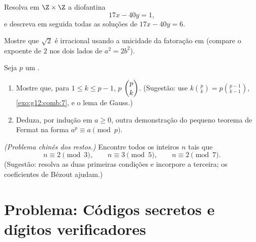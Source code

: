 \begin{exercise}[$\star\star$]\label{exo:g12:arith:7}
Resolva em $\Z \times \Z$ a  diofantina
\[
17x - 40y = 1,
\]
e descreva em seguida todas as soluções de $17x - 40y = 6$.
\end{exercise}

\begin{exercise}[$\star\star$]\label{exo:g12:arith:8}
Mostre que $\sqrt2$ é irracional usando a unicidade da fatoração em 
(compare o expoente de $2$ nos dois lados de $a^2 = 2b^2$).
\end{exercise}

\begin{exercise}[$\star\star\star$]\label{exo:g12:arith:9}
Seja $p$ um .
\begin{enumerate}
  \item Mostre que, para $1 \leq k \leq p - 1$, $p$ 
        $\dbinom{p}{k}$. (Sugestão: use $k\binom pk = p\binom{p-1}{k-1}$,
        \cref{exo:g12:comb:7}, e o lema de Gauss.)
  \item Deduza, por indução em $a \geq 0$, outra demonstração do pequeno
        teorema de Fermat na forma $a^p \equiv a \pmod p$.
\end{enumerate}
\end{exercise}

\begin{exercise}[$\star\star\star$]\label{exo:g12:arith:10}
\emph{(Problema chinês dos restos.)} Encontre todos os inteiros $n$ tais
que
\[
n \equiv 2 \pmod 3, \qquad n \equiv 3 \pmod 5, \qquad n \equiv 2 \pmod 7 .
\]
(Sugestão: resolva as duas primeiras condições e incorpore a terceira; os
coeficientes de Bézout ajudam.)
\end{exercise}

\section{Problema: Códigos secretos e dígitos verificadores}

